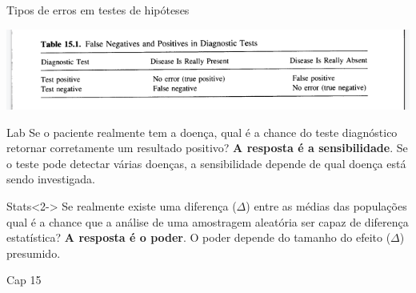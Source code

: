 \documentclass{beamer}
\begin{document}

\begin{frame}{\scriptsize Tipos de erros em testes de hipóteses}
  \begin{center}
    \includegraphics[width=.8\textwidth]{Cap10-11/tab15_1-falses_diag}

    \begin{block}{\scriptsize Lab}
      \tiny
      Se o paciente realmente tem a doença, qual é a chance do teste diagnóstico retornar corretamente um resultado positivo?
      {\bf A resposta é a sensibilidade}.
      Se o teste pode detectar várias doenças, a sensibilidade depende de \alert{qual doença} está sendo investigada.
    \end{block}
    \begin{block}{\scriptsize Stats}<2->
      \tiny
      Se realmente existe uma diferença ($\Delta$) entre as médias das populações qual é a chance que a análise de uma amostragem aleatória ser capaz de diferença estatística?
      {\bf A resposta é o poder}.
      O poder depende do \alert{tamanho do efeito} ($\Delta$) presumido.
    \end{block}
    \bigskip
  \end{center}

  \vfill
  \hfill \tiny Cap 15
\end{frame}
\end{document}
